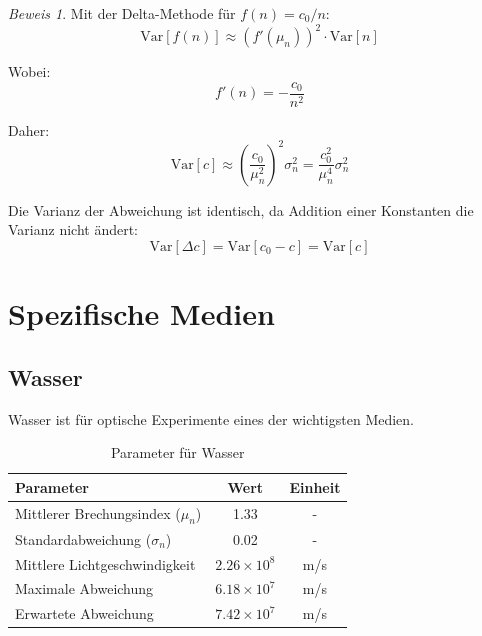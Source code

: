\documentclass[a4paper,12pt]{article}
\theoremstyle{definition}
\theoremstyle{remark}
\newtheorem*{beweis}{Beweis}
\newcommand{\cLight}{c}
\newcommand{\deviation}{\Delta}
\begin{document}
\begin{beweis}
Mit der Delta-Methode für $f(n) = \cLight_0/n$:
\begin{equation}
    \text{Var}[f(n)] \approx (f'(\mu_n))^2 \cdot \text{Var}[n]
\end{equation}

Wobei:
\begin{equation}
    f'(n) = -\frac{\cLight_0}{n^2}
\end{equation}

Daher:
\begin{equation}
    \text{Var}[\cLight] \approx \left(\frac{\cLight_0}{\mu_n^2}\right)^2 \sigma_n^2 = \frac{\cLight_0^2}{\mu_n^4} \sigma_n^2
\end{equation}

Die Varianz der Abweichung ist identisch, da Addition einer Konstanten die Varianz nicht ändert:
\begin{equation}
    \text{Var}[\deviation \cLight] = \text{Var}[\cLight_0 - \cLight] = \text{Var}[\cLight]
\end{equation}
\end{beweis}

\section{Spezifische Medien}

\subsection{Wasser}

Wasser ist für optische Experimente eines der wichtigsten Medien.

\begin{table}[h]
\centering
\begin{tabular}{|l|c|c|}
\toprule
\textbf{Parameter} & \textbf{Wert} & \textbf{Einheit} \\
\midrule
Mittlerer Brechungsindex ($\mu_n$) & 1.33 & - \\
Standardabweichung ($\sigma_n$) & 0.02 & - \\
Mittlere Lichtgeschwindigkeit & $2.26 \times 10^8$ & m/s \\
Maximale Abweichung & $6.18 \times 10^7$ & m/s \\
Erwartete Abweichung & $7.42 \times 10^7$ & m/s \\
\bottomrule
\end{tabular}
\caption{Parameter für Wasser}
\end{table}
\end{document}
